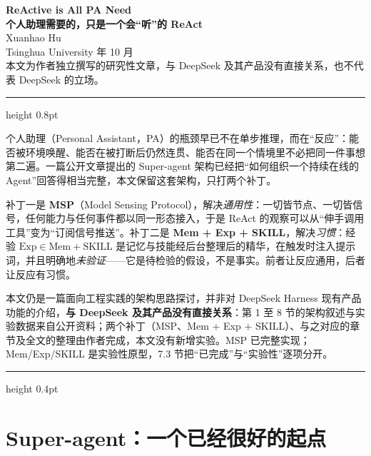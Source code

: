 \documentclass[11pt,a4paper,UTF8,fontset=windows]{ctexart}
\begin{document}
\thispagestyle{first}

\begin{center}
  {\LARGE\sffamily\bfseries ReActive is All PA Need}\\[0.5em]
  {\large\sffamily\bfseries 个人助理需要的，只是一个会“听”的 ReAct}\\[1.1em]
  {\normalsize Xuanhao Hu}\\[0.3em]
  {\footnotesize\color{dagray}Tsinghua University  年 10 月}\\[0.7em]
  {\footnotesize\color{dagray}本文为作者独立撰写的研究性文章，与 DeepSeek 及其产品没有直接关系，也不代表 DeepSeek 的立场。}
\end{center}
\vspace{0.6em}
{\color{dsblue}\hrule height 0.8pt}
\vspace{1.0em}

\noindent
{\small
\setlength{\parindent}{0pt}%
个人助理（Personal Assistant，PA）的瓶颈早已不在单步推理，而在“反应”：能否被环境唤醒、能否在被打断后仍然连贯、能否在同一个情境里不必把同一件事想第二遍。一篇公开文章提出的 Super-agent 架构已经把“如何组织一个持续在线的 Agent”回答得相当完整，本文保留这套架构，只打两个补丁。\par\vspace{0.45em}
补丁一是 \textbf{MSP}（Model Sensing Protocol），解决\emph{通用性}：一切皆节点、一切皆信号，任何能力与任何事件都以同一形态接入，于是 ReAct 的观察可以从“伸手调用工具”变为“订阅信号推送”。补丁二是 \textbf{Mem + Exp + SKILL}，解决\emph{习惯}：经验 $\mathrm{Exp}\in \mathrm{Mem}+\mathrm{SKILL}$ 是记忆与技能经后台整理后的精华，在触发时注入提示词，并且明确地\emph{未验证}——它是待检验的假设，不是事实。前者让反应通用，后者让反应有习惯。\par\vspace{0.45em}
本文仍是一篇面向工程实践的架构思路探讨，并非对 DeepSeek Harness 现有产品功能的介绍，\textbf{与 DeepSeek 及其产品没有直接关系}：第 1 至 8 节的架构叙述与实验数据来自公开资料；两个补丁（MSP、Mem + Exp + SKILL）、与之对应的章节及全文的整理由作者完成，本文没有新增实验。MSP 已完整实现；Mem/Exp/SKILL 是实验性原型，7.3 节把“已完成”与“实验性”逐项分开。
}
\vspace{0.9em}
{\color{dagray}\hrule height 0.4pt}
\vspace{1.4em}

\section{Super-agent：一个已经很好的起点}
\end{document}
